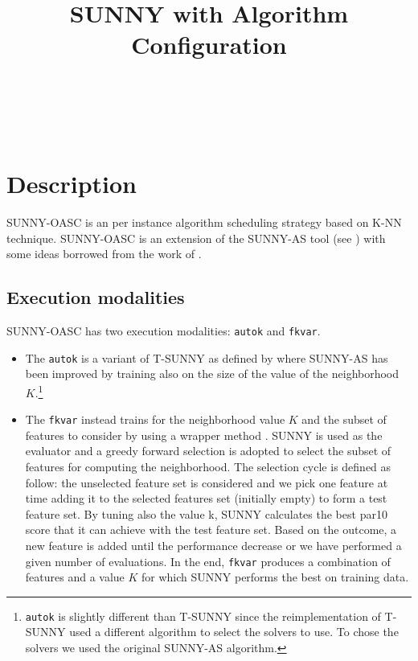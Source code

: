 \documentclass[tablecaption=bottom,wcp]{jmlr} %
\title[SUNNY-OASC]{SUNNY with Algorithm Configuration}
\author{\Name{Tong Liu} \Email{t.liu@unibo.it}\\
   \Name{Roberto Amadini} \Email{roberto.amadini@unimelb.edu.au}\\
   \Name{Jacopo Mauro} \Email{mauro.jacopo@gmail.com}\\
    }
\begin{document}
\maketitle



\section{Description}

SUNNY-OASC is an per instance algorithm scheduling strategy based on K-NN 
technique.
SUNNY-OASC is an extension of 
the SUNNY-AS tool (see \cite{ictai_paper,sunnyas}) with some 
ideas borrowed from the work of  
\cite{DBLP:conf/lion/LindauerBH16}. 


\subsection{Execution modalities}

SUNNY-OASC has two execution modalities: \texttt{autok} and 
\texttt{fkvar}. 

\begin{itemize}
  \item The \texttt{autok} is a variant of T-SUNNY as defined by 
\cite{DBLP:conf/lion/LindauerBH16} where SUNNY-AS has been improved by training 
also on the size of the value of the neighborhood 
$K$.\footnote{\texttt{autok} is slightly different than T-SUNNY since the 
reimplementation of T-SUNNY used a different algorithm to select the 
solvers to use. To chose the solvers we used the original SUNNY-AS 
algorithm.}
  \item The \texttt{fkvar} instead trains for the neighborhood value $K$ and 
the subset of features to consider by using a wrapper method 
\cite{Kohavi97wrappersfor}. SUNNY is used as the evaluator and a 
greedy forward selection is adopted to select the subset of features for 
computing the neighborhood.
% 
The selection cycle is defined as follow: 
the unselected feature set is considered and we pick one feature at time 
adding it to the selected features set (initially empty) to form a test 
feature set. By tuning also the value k, SUNNY calculates the best par10 score 
that it can achieve with the test feature set. Based on the outcome, a new 
feature is added until the performance decrease or we have performed a given 
number of evaluations. In the end, \texttt{fkvar} 
produces a combination of features and a value $K$ for which SUNNY performs the 
best on training data.
\end{itemize}
 
\end{document}
